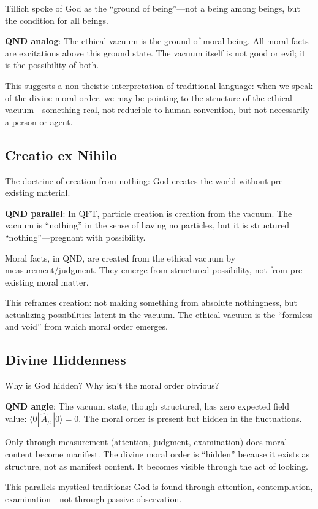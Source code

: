 \documentclass[12pt]{article}
\begin{document}
Tillich spoke of God as the ``ground of being''---not a being among beings, but the condition for all beings.

\textbf{QND analog}: The ethical vacuum is the ground of moral being. All moral facts are excitations above this ground state. The vacuum itself is not good or evil; it is the possibility of both.

This suggests a non-theistic interpretation of traditional language: when we speak of the divine moral order, we may be pointing to the structure of the ethical vacuum---something real, not reducible to human convention, but not necessarily a person or agent.

\subsection{Creatio ex Nihilo}

The doctrine of creation from nothing: God creates the world without pre-existing material.

\textbf{QND parallel}: In QFT, particle creation is creation from the vacuum. The vacuum is ``nothing'' in the sense of having no particles, but it is structured ``nothing''---pregnant with possibility.

Moral facts, in QND, are created from the ethical vacuum by measurement/judgment. They emerge from structured possibility, not from pre-existing moral matter.

This reframes creation: not making something from absolute nothingness, but actualizing possibilities latent in the vacuum. The ethical vacuum is the ``formless and void'' from which moral order emerges.

\subsection{Divine Hiddenness}

Why is God hidden? Why isn't the moral order obvious?

\textbf{QND angle}: The vacuum state, though structured, has zero expected field value: $\langle 0| \,\hat{A}_\mu\, |0\rangle = 0$. The moral order is present but hidden in the fluctuations.

Only through measurement (attention, judgment, examination) does moral content become manifest. The divine moral order is ``hidden'' because it exists as structure, not as manifest content. It becomes visible through the act of looking.

This parallels mystical traditions: God is found through attention, contemplation, examination---not through passive observation.
\end{document}
